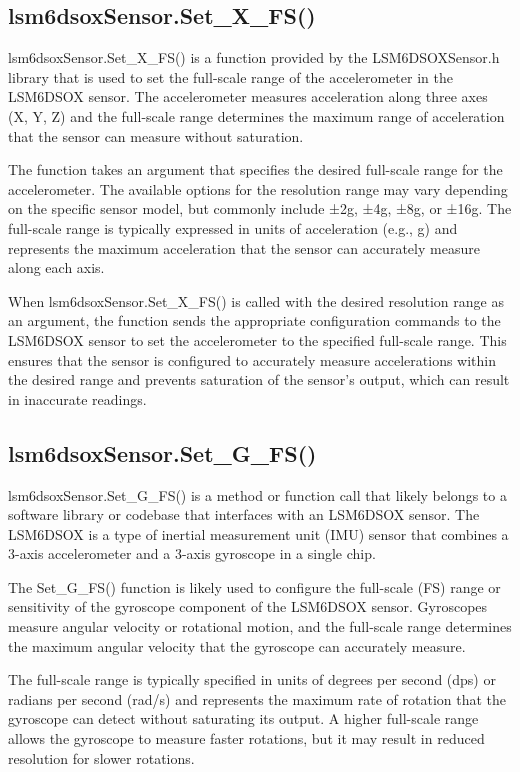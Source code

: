 \subsection{lsm6dsoxSensor.Set\_X\_FS()}
lsm6dsoxSensor.Set\_X\_FS() is a function provided by the LSM6DSOXSensor.h library that is used to set the full-scale range of the accelerometer in the LSM6DSOX sensor. The accelerometer measures acceleration along three axes (X, Y, Z) and the full-scale range determines the maximum range of acceleration that the sensor can measure without saturation.

The function takes an argument that specifies the desired full-scale range for the accelerometer. The available options for the resolution range may vary depending on the specific sensor model, but commonly include ±2g, ±4g, ±8g, or ±16g. The full-scale range is typically expressed in units of acceleration (e.g., g) and represents the maximum acceleration that the sensor can accurately measure along each axis.

When lsm6dsoxSensor.Set\_X\_FS() is called with the desired resolution range as an argument, the function sends the appropriate configuration commands to the LSM6DSOX sensor to set the accelerometer to the specified full-scale range. This ensures that the sensor is configured to accurately measure accelerations within the desired range and prevents saturation of the sensor's output, which can result in inaccurate readings.

\subsection{lsm6dsoxSensor.Set\_G\_FS()}
lsm6dsoxSensor.Set\_G\_FS() is a method or function call that likely belongs to a software library or codebase that interfaces with an LSM6DSOX sensor. The LSM6DSOX is a type of inertial measurement unit (IMU) sensor that combines a 3-axis accelerometer and a 3-axis gyroscope in a single chip.

The Set\_G\_FS() function is likely used to configure the full-scale (FS) range or sensitivity of the gyroscope component of the LSM6DSOX sensor. Gyroscopes measure angular velocity or rotational motion, and the full-scale range determines the maximum angular velocity that the gyroscope can accurately measure.

The full-scale range is typically specified in units of degrees per second (dps) or radians per second (rad/s) and represents the maximum rate of rotation that the gyroscope can detect without saturating its output. A higher full-scale range allows the gyroscope to measure faster rotations, but it may result in reduced resolution for slower rotations.

